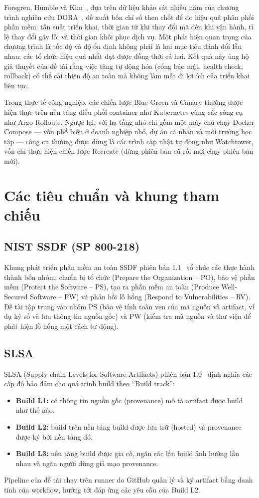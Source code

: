 \documentclass[12pt,a4paper,oneside]{extreport}
\begin{document}
Forsgren, Humble và Kim~\cite{forsgren2018}, dựa trên dữ liệu khảo sát nhiều
năm của chương trình nghiên cứu DORA~\cite{dora}, đề xuất bốn chỉ số then chốt
để đo hiệu quả phân phối phần mềm: tần suất triển khai, thời gian từ khi thay
đổi mã đến khi vận hành, tỉ lệ thay đổi gây lỗi và thời gian khôi phục dịch vụ.
Một phát hiện quan trọng của chương trình là tốc độ và độ ổn định không phải là
hai mục tiêu đánh đổi lẫn nhau: các tổ chức hiệu quả nhất đạt được đồng thời cả
hai. Kết quả này ủng hộ giả thuyết của đề tài rằng việc tăng tự động hóa (cổng
bảo mật, health check, rollback) có thể cải thiện độ an toàn mà không làm mất
đi lợi ích của triển khai liên tục.

Trong thực tế công nghiệp, các chiến lược Blue-Green và Canary thường được hiện
thực trên nền tảng điều phối container như Kubernetes cùng các công cụ như Argo
Rollouts. Ngược lại, với hạ tầng nhỏ chỉ gồm một máy chủ chạy Docker Compose
--- vốn phổ biến ở doanh nghiệp nhỏ, dự án cá nhân và môi trường học tập ---
công cụ thường được dùng là các trình cập nhật tự động như Watchtower, vốn chỉ
thực hiện chiến lược Recreate (dừng phiên bản cũ rồi mới chạy phiên bản mới).

\section{Các tiêu chuẩn và khung tham chiếu}
\label{sec:standards}
\subsection{NIST SSDF (SP 800-218)}
Khung phát triển phần mềm an toàn SSDF phiên bản 1.1~\cite{nist-ssdf} tổ chức
các thực hành thành bốn nhóm: chuẩn bị tổ chức (Prepare the Organization -- PO),
bảo vệ phần mềm (Protect the Software -- PS), tạo ra phần mềm an toàn (Produce
Well-Secured Software -- PW) và phản hồi lỗ hổng (Respond to Vulnerabilities --
RV). Đề tài tập trung vào nhóm PS (bảo vệ tính toàn vẹn của mã nguồn và
artifact, ví dụ ký số và lưu thông tin nguồn gốc) và PW (kiểm tra mã nguồn và
thư viện để phát hiện lỗ hổng một cách tự động).

\subsection{SLSA}
SLSA (Supply-chain Levels for Software Artifacts) phiên bản 1.0~\cite{slsa} định
nghĩa các cấp độ bảo đảm cho quá trình build theo ``Build track'':
\begin{itemize}
  \item \textbf{Build L1:} có thông tin nguồn gốc (provenance) mô tả artifact
  được build như thế nào.
  \item \textbf{Build L2:} build trên nền tảng build được lưu trữ (hosted) và
  provenance được ký bởi nền tảng đó.
  \item \textbf{Build L3:} nền tảng build được gia cố, ngăn các lần build ảnh
  hưởng lẫn nhau và ngăn người dùng giả mạo provenance.
\end{itemize}
Pipeline của đề tài chạy trên runner do GitHub quản lý và ký artifact bằng danh
tính của workflow, hướng tới đáp ứng các yêu cầu của Build L2.
\end{document}
